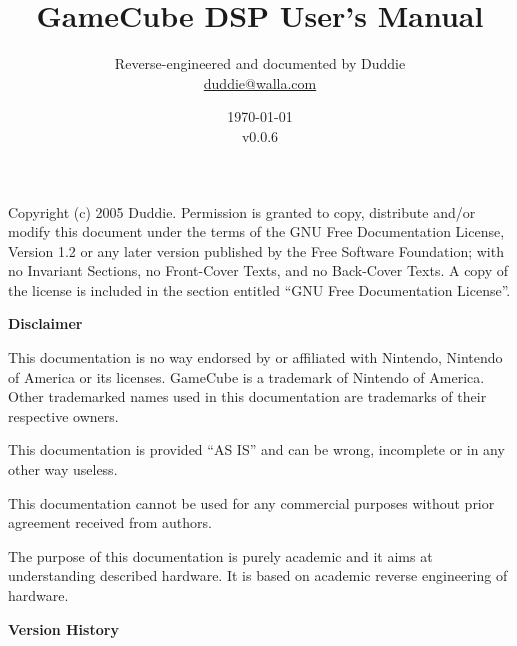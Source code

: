 \documentclass[oneside,english,a4paper,10pt,oneside,openany,final]{memoir}
\title{\textbf{\Huge GameCube DSP User's Manual}}
\author{Reverse-engineered and documented by Duddie \\ \href{mailto:duddie@walla.com}{duddie@walla.com}}
\date{\today\\v0.0.6}
\begin{document}
\maketitle{}

\pagebreak{}
\vspace*{\fill}

Copyright (c) 2005 Duddie. Permission is granted to copy, distribute and/or modify this document under the terms of the GNU Free Documentation License, Version 1.2 or any later version published by the Free Software Foundation; with no Invariant Sections, no Front-Cover Texts, and no Back-Cover Texts. A copy of the license is included in the section entitled ``GNU Free Documentation License''.

\pagebreak{}
\tableofcontents{}
\pagebreak{}

\textbf{\LARGE Disclaimer}
\vspace{5mm}

This documentation is no way endorsed by or affiliated with Nintendo, Nintendo of America or its licenses. GameCube is a trademark of Nintendo of America. Other trademarked names used in this documentation are trademarks of their respective owners.

This documentation is provided ``AS IS'' and can be wrong, incomplete or in any other way useless.

This documentation cannot be used for any commercial purposes without prior agreement received from authors.

The purpose of this documentation is purely academic and it aims at understanding described hardware. It is based on academic reverse engineering of hardware.

\pagebreak{}
\textbf{\LARGE Version History}
\vspace{5mm}
\end{document}
